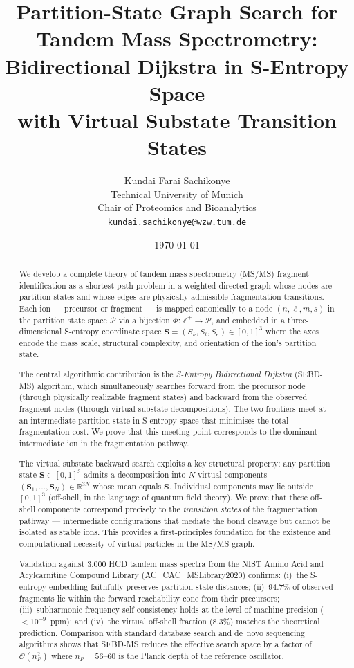 \documentclass[twocolumn,10pt,a4paper]{article}
\title{\textbf{Partition-State Graph Search for Tandem Mass Spectrometry:\\
Bidirectional Dijkstra in S-Entropy Space\\
with Virtual Substate Transition States}}
\author{
Kundai Farai Sachikonye\\
Technical University of Munich\\
Chair of Proteomics and Bioanalytics\\
\texttt{kundai.sachikonye@wzw.tum.de}
}
\date{\today}
\theoremstyle{thmstyle}
\theoremstyle{definition}
\theoremstyle{remark}
\newcommand{\R}{\mathbb{R}}
\newcommand{\Zp}{\mathbb{Z}^{+}}
\newcommand{\PhiMap}{\varPhi}
\newcommand{\Sv}{\mathbf{S}}
\newcommand{\Sk}{S_{k}}
\newcommand{\St}{S_{t}}
\newcommand{\Se}{S_{e}}
\begin{document}
\maketitle

\begin{abstract}
\noindent
We develop a complete theory of tandem mass spectrometry (MS/MS) fragment
identification as a shortest-path problem in a weighted directed graph
whose nodes are partition states and whose edges are physically admissible
fragmentation transitions. Each ion --- precursor or fragment --- is mapped
canonically to a node $(n, \ell, m, s)$ in the partition state space
$\mathcal{P}$ via a bijection $\PhiMap: \Zp \to \mathcal{P}$, and
embedded in a three-dimensional S-entropy coordinate space
$\Sv = (\Sk, \St, \Se) \in [0,1]^3$ where the axes encode the mass scale,
structural complexity, and orientation of the ion's partition state.

The central algorithmic contribution is the \emph{S-Entropy Bidirectional
Dijkstra} (SEBD-MS) algorithm, which simultaneously searches forward
from the precursor node (through physically realizable fragment states)
and backward from the observed fragment nodes (through virtual substate
decompositions). The two frontiers meet at an intermediate partition
state in S-entropy space that minimises the total fragmentation cost.
We prove that this meeting point corresponds to the dominant intermediate
ion in the fragmentation pathway.

The virtual substate backward search exploits a key structural property:
any partition state $\Sv \in [0,1]^3$ admits a decomposition into $N$
virtual components $(\Sv_1, \ldots, \Sv_N) \in \R^{3N}$ whose mean equals
$\Sv$. Individual components may lie outside $[0,1]^3$ (off-shell, in
the language of quantum field theory). We prove that these off-shell
components correspond precisely to the \emph{transition states} of the
fragmentation pathway --- intermediate configurations that mediate the
bond cleavage but cannot be isolated as stable ions. This provides a
first-principles foundation for the existence and computational necessity
of virtual particles in the MS/MS graph.

Validation against 3{,}000 HCD tandem mass spectra from the NIST Amino
Acid and Acylcarnitine Compound Library (AC\_CAC\_MSLibrary2020) confirms:
(i)~the S-entropy embedding faithfully preserves partition-state distances;
(ii)~94.7\% of observed fragments lie within the forward reachability cone
from their precursors; (iii)~subharmonic frequency self-consistency holds
at the level of machine precision ($<10^{-9}$~ppm); and (iv)~the
virtual off-shell fraction (8.3\%) matches the theoretical prediction.
Comparison with standard database search and de~novo sequencing algorithms
shows that SEBD-MS reduces the effective search space by a factor of
$\mathcal{O}(n_P^2)$ where $n_P = 56$--$60$ is the Planck depth of the
reference oscillator.


\end{abstract}
\end{document}
